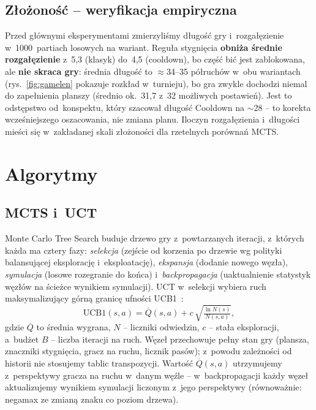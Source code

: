 \documentclass[12pt,a4paper]{article}
\begin{document}
\subsection{Złożoność -- weryfikacja empiryczna}\label{sec:complexity}
Przed głównymi eksperymentami zmierzyliśmy długość gry i~rozgałęzienie w~1000~partiach losowych na
wariant. Reguła stygnięcia \textbf{obniża średnie rozgałęzienie} z~5,3 (klasyk) do~4,5 (cooldown),
bo część bić jest zablokowana, ale \textbf{nie skraca gry}: średnia długość to $\approx$34--35
półruchów w~obu wariantach (rys.~\ref{fig:gamelen} pokazuje rozkład w~turnieju), bo gra zwykle
dochodzi niemal do zapełnienia planszy (średnio ok.\ 31,7 z~32 możliwych postawień). Jest to odstępstwo od~konspektu, który szacował długość Cooldown na $\sim$28 -- to
korekta wcześniejszego oszacowania, nie zmiana planu. Iloczyn rozgałęzienia i~długości mieści się w~zakładanej skali
złożoności dla rzetelnych porównań MCTS.



\section{Algorytmy}\label{sec:algorytmy}

\subsection{MCTS i~UCT}
Monte Carlo Tree Search buduje drzewo gry z~powtarzanych iteracji, z~których każda ma cztery fazy:
\emph{selekcja} (zejście od korzenia po drzewie wg polityki balansującej eksplorację
i~eksploatację), \emph{ekspansja} (dodanie nowego węzła), \emph{symulacja} (losowe rozegranie do
końca) i~\emph{backpropagacja} (uaktualnienie statystyk węzłów na ścieżce wynikiem symulacji). UCT
\cite{kocsis2006bandit} w~selekcji wybiera ruch maksymalizujący górną granicę ufności
UCB1~\cite{auer2002finite}:
\[ \mathrm{UCB1}(s,a) = \overline{Q}(s,a) + c\,\sqrt{\tfrac{\ln N(s)}{N(s,a)}}, \]
gdzie $\overline{Q}$ to średnia wygrana, $N$ -- liczniki odwiedzin, $c$ -- stała eksploracji,
a~budżet $B$ -- liczba iteracji na ruch. Węzeł przechowuje pełny stan gry (plansza, znaczniki
stygnięcia, gracz na ruchu, licznik pasów); z~powodu zależności od historii nie stosujemy tablic
transpozycji. Wartość $\overline{Q}(s,a)$ utrzymujemy z~perspektywy gracza na ruchu w~danym węźle --
w~backpropagacji każdy węzeł aktualizujemy wynikiem symulacji liczonym z~jego perspektywy
(równoważnie: negamax ze zmianą znaku co poziom drzewa).
\end{document}
